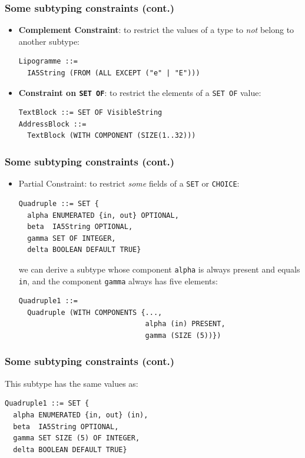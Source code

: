 \documentclass[compress,dvips,xcolor={dvipsnames},t]{beamer}
\begin{document}
\begin{frame}[containsverbatim]
\frametitle{Some subtyping constraints (cont.)}

\begin{itemize}

  \item \textbf{Complement Constraint}: to restrict the values of a
        type to \emph{not} belong to another subtype:

\begin{verbatim}
Lipogramme ::=
  IA5String (FROM (ALL EXCEPT ("e" | "E")))
\end{verbatim}

\bigskip

  \item \textbf{Constraint on \texttt{SET OF}}: to restrict the
        elements of a \texttt{SET OF} value:

\begin{verbatim}
TextBlock ::= SET OF VisibleString
AddressBlock ::=
  TextBlock (WITH COMPONENT (SIZE(1..32)))
\end{verbatim}

\end{itemize}

\end{frame}

\begin{frame}[containsverbatim]
\frametitle{Some subtyping constraints (cont.)}

\begin{itemize}
  \item \textsf{Partial Constraint}: to restrict \emph{some} fields
        of a \texttt{SET} or \texttt{CHOICE}:

\begin{verbatim}
Quadruple ::= SET {
  alpha ENUMERATED {in, out} OPTIONAL,
  beta  IA5String OPTIONAL,
  gamma SET OF INTEGER,
  delta BOOLEAN DEFAULT TRUE}
\end{verbatim}

we can derive a subtype whose component \verb+alpha+ is always present
and equals \verb+in+, and the component \verb+gamma+ always has
five elements:
\begin{verbatim}
Quadruple1 ::=
  Quadruple (WITH COMPONENTS {...,
                              alpha (in) PRESENT,
                              gamma (SIZE (5))})
\end{verbatim}

\end{itemize}

\end{frame}

\begin{frame}[containsverbatim]
\frametitle{Some subtyping constraints (cont.)}

This subtype has the same values as:
\begin{verbatim}
Quadruple1 ::= SET {
  alpha ENUMERATED {in, out} (in),
  beta  IA5String OPTIONAL,
  gamma SET SIZE (5) OF INTEGER,
  delta BOOLEAN DEFAULT TRUE}
\end{verbatim}

\end{frame}
\end{document}
